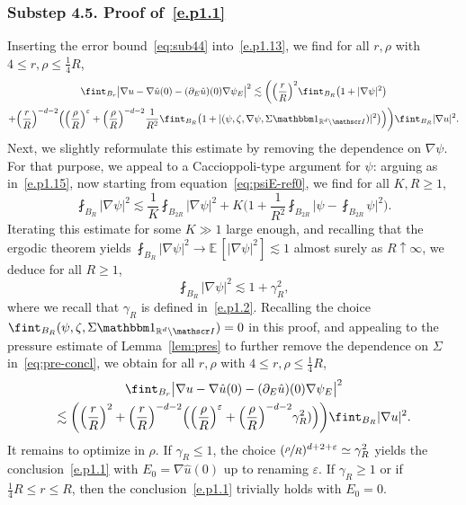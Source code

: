 \documentclass[JEP,XML,SOM,Unicode,published]{cedram}
\let\mathcal\mathscr
\let\mathds\mathbbm
\theoremstyle{plain}
\theoremstyle{definition}
\newcommand{\e}{\varepsilon}
\newcommand{\R}{\mathbb R}
\newcommand{\Ic}{\mathcal I}
\newcommand{\substep}[1]{\subsubsection*{Substep #1}}
\newcommand{\expecmm}[1]{\mathbb{E}\,[ #1 ]}
\begin{document}
\substep{4.5. Proof of~\eqref{e.p1.1}}
Inserting the error bound~\eqref{eq:sub44} into~\eqref{e.p1.13}, we find for all $r,\rho$ with $4\le r,\rho\le\frac14R$,
\begin{multline}\label{eq:pre-concl}
\fint_{B_r} \big|\nabla u-\nabla\hat u(0)-(\partial_E \hat u)(0)\nabla \psi_E\big|^2
\lesssim \bigg(\Bigl(\frac{r}{R}\Bigr)^2\fint_{B_R}\big(1+|\nabla\psi|^2\big)\\
+\Bigl(\frac{r}{R}\Bigr)^{-d-2}\Big(\Bigl(\frac{\rho}{R}\Bigr)^\e+\Bigl(\frac{\rho}{R}\Bigr)^{-d-2}\frac1{R^2}\fint_{B_R}\big(1+|(\psi,\zeta,\nabla\psi,\Sigma\mathds1_{\R^d\setminus\Ic})|^2\big)\Big)\bigg)\fint_{B_R}|\nabla u|^2.
\end{multline}
Next, we slightly reformulate this estimate by removing the dependence on $\nabla\psi$.
For that purpose, we appeal to a Caccioppoli-type argument for $\psi$: arguing as in~\eqref{e.p1.15}, now starting from equation~\eqref{eq:psiE-ref0}, we find for all $K,R\ge1$,
\begin{equation*}
\fint_{B_{R}}|\nabla\psi|^2\lesssim \frac1K\fint_{B_{2R}}|\nabla\psi|^2+K\bigg(1+\frac{1}{R^2}\fint_{B_{2R}}\Big|\psi-\fint_{B_{2R}}\psi\Big|^2\bigg).
\end{equation*}
Iterating this estimate for some $K\gg1$ large enough, and recalling that the ergodic theorem yields $\fint_{B_R}|\nabla\psi|^2\to\expecmm{|\nabla\psi|^2}\lesssim1$ almost surely as $R\uparrow\infty$, we deduce for all $R\ge1$,
\begin{equation}\label{eq:bnditer-psiE}
\fint_{B_{R}}|\nabla\psi|^2
\lesssim 1+\gamma_{R}^2,
\end{equation}
where we recall that $\gamma_R$ is defined in~\eqref{e.p1.2}.
Recalling the choice $\fint_{B_R}(\psi,\zeta,\Sigma\mathds1_{\R^d\setminus\Ic})=0$ in this proof, and appealing to the pressure estimate of Lemma~\ref{lem:pres} to further remove the dependence on $\Sigma$ in~\eqref{eq:pre-concl}, we obtain for all $r,\rho$ with $4\le r,\rho\le\frac14R$,
\begin{multline*}
\fint_{B_r} \big|\nabla u-\nabla\hat u(0)-(\partial_E \hat u)(0)\nabla \psi_E\big|^2\\
\lesssim \bigg(\Bigl(\frac{r}{R}\Bigr)^2
+\Bigl(\frac{r}{R}\Bigr)^{-d-2}\Big(\Bigl(\frac{\rho}{R}\Bigr)^\e+\Bigl(\frac{\rho}{R}\Bigr)^{-d-2}\gamma_{R}^2)\Big)\bigg)\fint_{B_R}|\nabla u|^2.
\end{multline*}
It remains to optimize in $\rho$.
If $\gamma_{R}\le1$, the choice $(\sfrac\rho R)^{d+2+\e}\simeq\gamma_R^2$ yields the conclusion~\eqref{e.p1.1} with $E_0=\nabla\hat u(0)$ up to renaming $\e$. If $\gamma_R\ge1$ or if $\frac14R\le r\le R$, then the conclusion~\eqref{e.p1.1} trivially holds with $E_0=0$.
\end{document}
